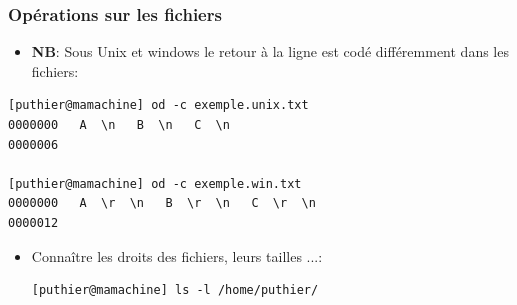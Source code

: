 \documentclass[10pt, xcolor=dvipsnames]{beamer}
\begin{document}
\begin{frame}[fragile]
\frametitle{Opérations sur les fichiers}

\begin{itemize}

\item \textbf{NB}: Sous Unix et windows le retour à la ligne est codé différemment dans les fichiers:
\end{itemize}
         
\begin{verbatim}
[puthier@mamachine] od -c exemple.unix.txt
0000000   A  \n   B  \n   C  \n
0000006

[puthier@mamachine] od -c exemple.win.txt 
0000000   A  \r  \n   B  \r  \n   C  \r  \n 
0000012
\end{verbatim}

\end{frame}



\begin{frame}[fragile]


        \begin{itemize}

           \item Connaître les droits des fichiers, leurs tailles ...:\\
          \begin{verbatim}
[puthier@mamachine] ls -l /home/puthier/
          \end{verbatim}
        \end{itemize}
\end{frame}





\end{document}

